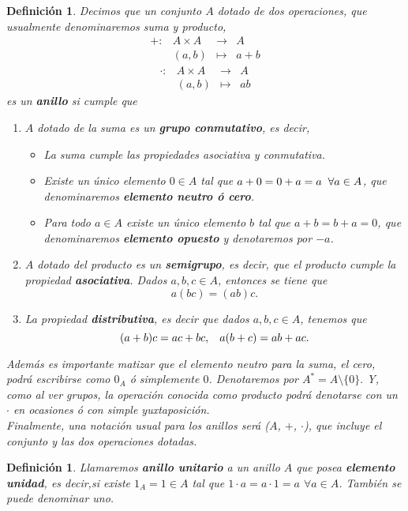 \documentclass[12pt]{article}
\newtheorem{definition}[theorem]{Definición}
\begin{document}
\begin{definition} Decimos que un conjunto $A$ dotado de dos operaciones, que usualmente denominaremos suma y producto, $$\begin{array}{rccl}
+ \colon &A \times A & \longrightarrow & A\\
&(a,b) & \longmapsto &a+b
\end{array}
$$
$$\begin{array}{rccl}
\cdot \colon &A \times A & \longrightarrow & A\\
&(a,b) & \longmapsto &ab
\end{array}
$$
es un \textbf{anillo} si cumple que \begin{enumerate}
\item $A$ dotado de la suma es un \textbf{grupo conmutativo}, es decir, \begin{itemize}
\item La suma cumple las propiedades asociativa y conmutativa.
\item Existe un único elemento $0 \in A$ tal que $a + 0 = 0 + a = a\hspace{0.2cm} \forall a \in A$, que denominaremos \textbf{elemento neutro ó cero}.
\item Para todo $a \in A$ existe un único elemento $b$ tal que $a + b = b +a = 0$, que denominaremos \textbf{elemento opuesto} y denotaremos por $-a$.
\end{itemize}
\item $A$ dotado del producto es un \textbf{semigrupo}, es decir, que el producto cumple la propiedad \textbf{asociativa}. Dados $a, b, c \in A$, entonces se tiene que $$a(bc)= (ab)c.$$
\item La propiedad \textbf{distributiva}, es decir que dados $a,b,c \in A$, tenemos que $$(a+b)c = ac+bc, \hspace{0.3cm} a(b+c) = ab+ac.$$
\end{enumerate}
Además es importante matizar que el elemento neutro para la suma, el cero, podrá escribirse como $0_{A}$ ó simplemente $0$. Denotaremos por $A^{\ast} = A\setminus \lbrace 0 \rbrace.$ Y, como al ver grupos, la operación conocida como producto podrá denotarse con un $\cdot$ en ocasiones ó con simple yuxtaposición.\vspace{0.2cm}\\
Finalmente, una notación usual para los anillos será ($A$, $+$, $\cdot$), que incluye el conjunto y las dos operaciones dotadas.
\end{definition}

\begin{definition} Llamaremos \textbf{anillo unitario} a un anillo $A$ que posea \textbf{elemento unidad}, es decir,si existe $1_{A} = 1 \in A$ tal que $1 \cdot a = a \cdot 1 = a$ \hspace{0.1cm} $\forall a \in A$. También se puede denominar uno.
\end{definition}
\end{document}
